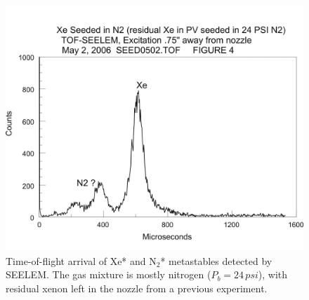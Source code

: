 \documentclass[12pt]{mitthesis}
\begin{document}
\begin{figure}
  \caption{Time-of-flight arrival of Xe* and N$_2$* metastables
    detected by SEELEM.  The gas mixture is mostly nitrogen
    ($P_b=24\,psi$), with residual xenon left in the nozzle from a
    previous experiment.}
  \label{fig:old-tof}
  \centering
  \includegraphics[width=6in]{old-tof.png}
\end{figure}
\end{document}
